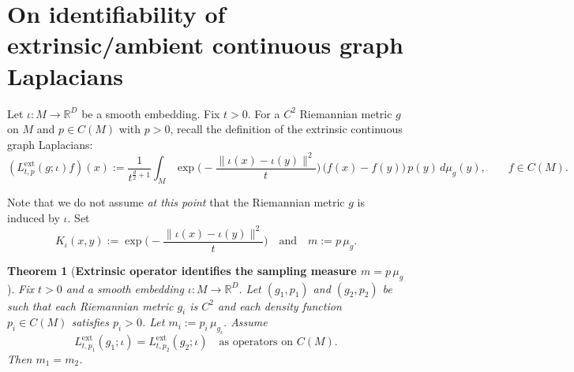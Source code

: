 \documentclass{amsart}
\newtheorem{theorem}{Theorem}[section]
\newtheorem{lemma}[theorem]{Lemma}
\theoremstyle{definition}
\theoremstyle{remark}
\newcommand{\nd}{\noindent}
\newcommand{\0}{\boldsymbol{0}}
\begin{document}
\section{On identifiability of extrinsic/ambient continuous graph Laplacians}\label{scn:extrinsic-GL}

\nd Let $\iota:M\to\mathbb{R}^D$ be a smooth embedding. Fix $t>0.$
For a $C^2$ Riemannian metric $g$ on $M$ and $p\in C(M)$ with $p>0$, recall the definition of the extrinsic continuous graph Laplacians:
\begin{equation}
\label{eq:extrinsic_L}
(L^{\mathrm{ext}}_{t,p}(g;\iota)f)(x)
:=\frac{1}{t^{\frac d2+1}}\int_M \exp\!\Big(-\frac{\|\iota(x)-\iota(y)\|^2}{t}\Big)\,\bigl(f(x)-f(y)\bigr)\,p(y)\,d\mu_g(y),
\qquad f\in C(M).
\end{equation}

\nd Note that we do not assume \textit{at this point} that the Riemannian metric $g$ is induced by $\iota.$
Set
\[
K_\iota(x,y):=\exp\!\Big(-\frac{\|\iota(x)-\iota(y)\|^2}{t}\Big)
\quad\text{and}\quad
m:=p\,\mu_g.
\]

\begin{theorem}[\textbf{Extrinsic operator identifies the sampling measure $m=p\,\mu_g$}]
\label{thm:extrinsic_identifies_measure}
Fix $t>0$ and a smooth embedding $\iota:M\to\mathbb{R}^D$.
Let $(g_1,p_1)$ and $(g_2,p_2)$ be such that each Riemannian metric $g_i$ is $C^2$ and each density function $p_i\in C(M)$ satisfies $p_i>0$.
Let $m_i:=p_i\,\mu_{g_i}$. Assume
\[
L^{\mathrm{ext}}_{t,p_1}(g_1;\iota)=L^{\mathrm{ext}}_{t,p_2}(g_2;\iota)
\quad\text{as operators on }C(M).
\]
Then $m_1=m_2$.
\end{theorem}
\end{document}
